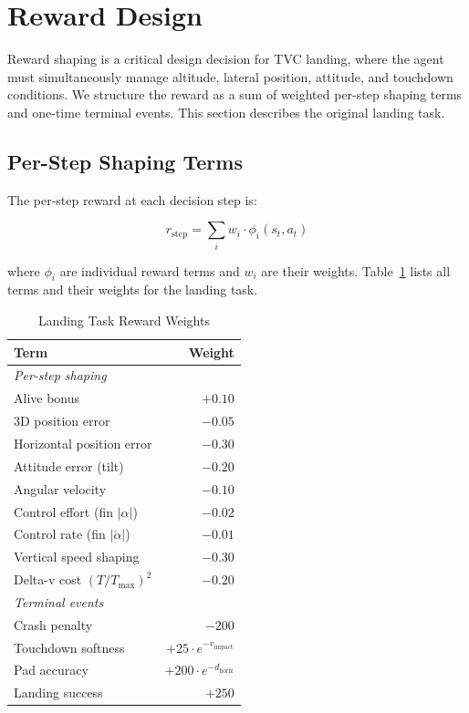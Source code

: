 \documentclass[conference]{IEEEtran}
\begin{document}
\section{Reward Design}

Reward shaping is a critical design decision for TVC landing, where the agent must simultaneously manage altitude, lateral position, attitude, and touchdown conditions. We structure the reward as a sum of weighted per-step shaping terms and one-time terminal events. This section describes the original landing task.

\subsection{Per-Step Shaping Terms}

The per-step reward at each decision step is:

\begin{equation}
r_{\text{step}} = \sum_{i} w_i \cdot \phi_i(s_t, a_t)
\label{eq:step_reward}
\end{equation}

\noindent where $\phi_i$ are individual reward terms and $w_i$ are their weights. Table~\ref{tab:reward_weights} lists all terms and their weights for the landing task.

\begin{table}[htbp]
\caption{Landing Task Reward Weights}
\label{tab:reward_weights}
\centering
\begin{tabular}{lr}
\toprule
\textbf{Term} & \textbf{Weight} \\
\midrule
\multicolumn{2}{l}{\textit{Per-step shaping}} \\
Alive bonus & $+0.10$ \\
3D position error & $-0.05$ \\
Horizontal position error & $-0.30$ \\
Attitude error (tilt) & $-0.20$ \\
Angular velocity & $-0.10$ \\
Control effort (fin $|\alpha|$) & $-0.02$ \\
Control rate (fin $|\dot{\alpha}|$) & $-0.01$ \\
Vertical speed shaping & $-0.30$ \\
Delta-v cost $(T/T_{\max})^2$ & $-0.20$ \\
\midrule
\multicolumn{2}{l}{\textit{Terminal events}} \\
Crash penalty & $-200$ \\
Touchdown softness & $+25 \cdot e^{-v_{\text{impact}}}$ \\
Pad accuracy & $+200 \cdot e^{-d_{\text{horiz}}}$ \\
Landing success & $+250$ \\
\bottomrule
\end{tabular}
\end{table}
\end{document}
